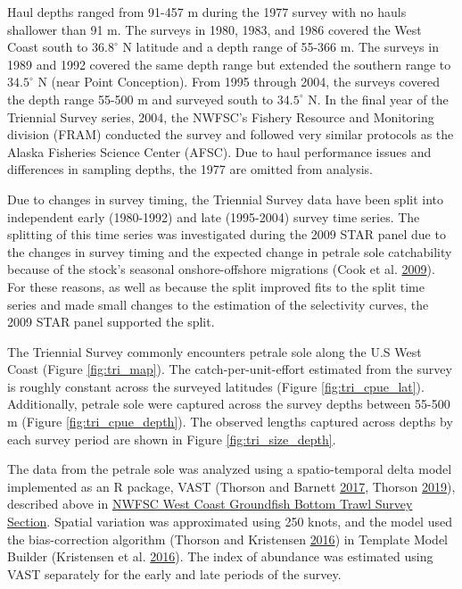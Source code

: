 \documentclass[12pt,]{article}
\begin{document}
Haul depths ranged from 91-457 m during the 1977 survey with no hauls
shallower than 91 m. The surveys in 1980, 1983, and 1986 covered the
West Coast south to \(36.8^\circ\) N latitude and a depth range of
55-366 m. The surveys in 1989 and 1992 covered the same depth range but
extended the southern range to \(34.5^\circ\) N (near Point Conception).
From 1995 through 2004, the surveys covered the depth range 55-500 m and
surveyed south to \(34.5^\circ\) N. In the final year of the Triennial
Survey series, 2004, the NWFSC's Fishery Resource and Monitoring
division (FRAM) conducted the survey and followed very similar protocols
as the Alaska Fisheries Science Center (AFSC). Due to haul performance
issues and differences in sampling depths, the 1977 are omitted from
analysis.

Due to changes in survey timing, the Triennial Survey data have been
split into independent early (1980-1992) and late (1995-2004) survey
time series. The splitting of this time series was investigated during
the 2009 STAR panel due to the changes in survey timing and the expected
change in petrale sole catchability because of the stock's seasonal
onshore-offshore migrations (Cook et al.
\protect\hyperlink{ref-cook_petrale_2009}{2009}). For these reasons, as
well as because the split improved fits to the split time series and
made small changes to the estimation of the selectivity curves, the 2009
STAR panel supported the split.

The Triennial Survey commonly encounters petrale sole along the U.S West
Coast (Figure \ref{fig:tri_map}). The catch-per-unit-effort estimated
from the survey is roughly constant across the surveyed latitudes
(Figure \ref{fig:tri_cpue_lat}). Additionally, petrale sole were
captured across the survey depths between 55-500 m (Figure
\ref{fig:tri_cpue_depth}). The observed lengths captured across depths
by each survey period are shown in Figure \ref{fig:tri_size_depth}.

The data from the petrale sole was analyzed using a spatio-temporal
delta model implemented as an R package, VAST (Thorson and Barnett
\protect\hyperlink{ref-thorson_comparing_2017}{2017}, Thorson
\protect\hyperlink{ref-thorson_guidance_2019}{2019}), described above in
\protect\hyperlink{nwfsc_survey}{NWFSC West Coast Groundfish Bottom
Trawl Survey Section}. Spatial variation was approximated using 250
knots, and the model used the bias-correction algorithm (Thorson and
Kristensen \protect\hyperlink{ref-thorson_implementing_2016}{2016}) in
Template Model Builder (Kristensen et al.
\protect\hyperlink{ref-kristensen_tmb:_2016}{2016}). The index of
abundance was estimated using VAST separately for the early and late
periods of the survey.
\end{document}
